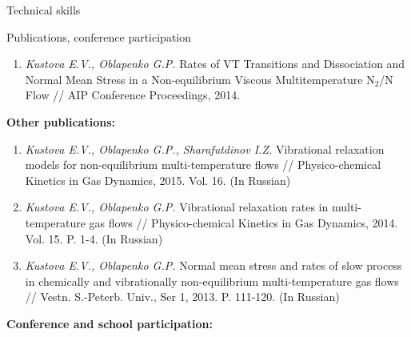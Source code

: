 \documentclass{resume} %
\begin{document}
\begin{rSection}{Technical skills}
\begin{rSection}{Publications, conference participation}
\begin{enumerate}
\item  \emph{Kustova E.V., Oblapenko G.P.} Rates of VT Transitions and Dissociation and Normal Mean Stress in a Non-equilibrium Viscous Multitemperature N$_2$/N Flow // AIP Conference Proceedings, 2014.


\end{enumerate}


{\bf Other publications:}

\begin{enumerate}
    \item  \emph{Kustova E.V., Oblapenko G.P., Sharafutdinov I.Z.} Vibrational relaxation models for non-equilibrium multi-temperature flows // Physico-chemical Kinetics in Gas Dynamics, 2015. Vol. 16. (In Russian)

    \item  \emph{Kustova E.V., Oblapenko G.P.} Vibrational relaxation rates in multi-temperature gas flows // Physico-chemical Kinetics in Gas Dynamics, 2014. Vol. 15. P. 1-4. (In Russian)

    \item  \emph{Kustova E.V., Oblapenko G.P.} Normal mean stress and rates of slow process in chemically and vibrationally non-equilibrium multi-temperature gas flows // Vestn. S.-Peterb. Univ., Ser 1, 2013. P. 111-120. (In Russian)
\end{enumerate}

{\bf Conference and school participation:}


\end{rSection}
\end{rSection}
\end{document}
